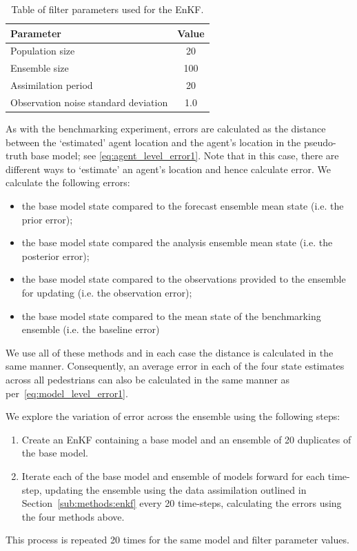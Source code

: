 \documentclass{article}
\begin{document}
\begin{table}[ht]
	\centering
	\begin{tabular}{@{}lc@{}}
		\toprule
		Parameter           & Value \\ \midrule
		Population size     & 20    \\
		Ensemble size       & 100   \\
		Assimilation period & 20    \\
		Observation noise standard deviation   & 1.0   \\ \bottomrule
	\end{tabular}\caption{Table of filter parameters used for the
		EnKF.}\label{tab:gcs_exp_params}
\end{table}

As with the benchmarking experiment, errors are calculated as the distance between the `estimated' agent location and the agent's location in the pseudo-truth base model; see \eqref{eq:agent_level_error1}. Note that in this case, there are different ways to `estimate' an agent's location and hence calculate error. We calculate the following errors:
\begin{itemize}
	\item the base model state compared to the forecast ensemble mean state (i.e. the prior error);
	\item the base model state compared the analysis ensemble mean state (i.e. the posterior error);
	\item the base model state compared to the observations provided to the ensemble for updating (i.e. the observation error);
	\item the base model state compared to the mean state of the benchmarking ensemble (i.e. the baseline error)
\end{itemize}
We use all of these methods and in each case the distance is calculated in the same manner. Consequently, an average error in each of the four state estimates across all pedestrians can also be calculated in the same manner as per~\eqref{eq:model_level_error1}.

We explore the variation of error across the ensemble using the following steps:
\begin{enumerate}
	\item Create an EnKF containing a base model and an ensemble of 20 duplicates of the base model. 
	\item Iterate each of the base model and ensemble of models forward for each time-step, updating the ensemble using the data assimilation outlined in Section~\ref{sub:methods:enkf} every 20 time-steps, calculating the errors using the four methods above.
\end{enumerate}
This process is repeated 20 times for the same model and filter parameter values. 
\end{document}

